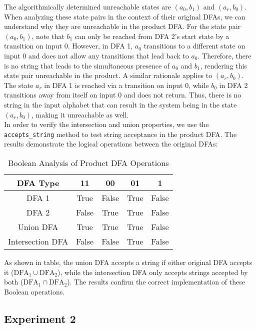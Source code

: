\documentclass[conference]{IEEEtran}
\begin{document}
The algorithmically determined unreachable states are \( (a_0, b_1) \) and \( (a_r, b_0) \). When analyzing these state pairs in the context of their original DFAs, we can understand why they are unreachable in the product DFA. For the state pair \( (a_0, b_1) \), note that \( b_1 \) can only be reached from DFA 2’s start state by a transition on input 0. However, in DFA 1, \( a_0 \) transitions to a different state on input 0 and does not allow any transitions that lead back to \( a_0 \). Therefore, there is no string that leads to the simultaneous presence of \( a_0 \) and \( b_1 \), rendering this state pair unreachable in the product. A similar rationale applies to \( (a_r, b_0) \). The state \( a_r \) in DFA 1 is reached via a transition on input 0, while \( b_0 \) in DFA 2 transitions away from itself on input 0 and does not return. Thus, there is no string in the input alphabet that can result in the system being in the state \( (a_r, b_0) \), making it unreachable as well. \\


In order to verify the intersection and union properties, we use the \texttt{accepts\_string} method to test string acceptance in the product DFA. The results demonstrate the logical operations between the original DFAs:

\begin{table}[h!]
\centering
\caption{Boolean Analysis of Product DFA Operations}
\label{table-dfa_boolean}
\begin{tabular}{|c|c|c|c|c|}
\hline
\textbf{DFA Type} & \textbf{11} & \textbf{00} & \textbf{01} & \textbf{1} \\ \hline
DFA 1 & True & False & True & False \\ \hline
DFA 2 & False & True & True & False \\ \hline
Union DFA & True & True & True & False \\ \hline
Intersection DFA & False & False & True & False \\ \hline
\end{tabular}
\end{table} 

As shown in table, the union DFA accepts a string if either original DFA accepts it ($\text{DFA}_1 \cup \text{DFA}_2$), while the intersection DFA only accepts strings accepted by both ($\text{DFA}_1 \cap \text{DFA}_2$). The results confirm the correct implementation of these Boolean operations.


\subsection{Experiment 2}
\end{document}
